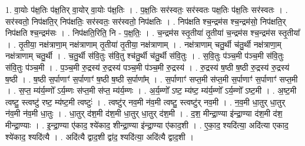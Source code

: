 \documentclass[17pt]{extarticle}
\begin{document}
1. वा॒योः प॑क्ष॒तिः प॑क्ष॒तिर् वा॒योर् वा॒योः प॑क्ष॒तिः । . प॒क्ष॒तिः सर॑स्वतः॒ सर॑स्वतः पक्ष॒तिः प॑क्ष॒तिः सर॑स्वतः । . सर॑स्वतो॒ निप॑क्षति॒र् निप॑क्षतिः॒ सर॑स्वतः॒ सर॑स्वतो॒ निप॑क्षतिः । . निप॑क्षति श्च॒न्द्रम॑स श्च॒न्द्रम॑सो॒ निप॑क्षति॒र् निप॑क्षति श्च॒न्द्रम॑सः । . निप॑क्षति॒रिति॒ नि - प॒क्ष॒तिः॒ । . च॒न्द्रम॑स स्तृ॒तीया॑ तृ॒तीया॑ च॒न्द्रम॑स श्च॒न्द्रम॑स स्तृ॒तीया᳚ । . तृ॒तीया॒ नक्ष॑त्राणा॒म् नक्ष॑त्राणाम् तृ॒तीया॑ तृ॒तीया॒ नक्ष॑त्राणाम् । . नक्ष॑त्राणाम् चतु॒र्थी च॑तु॒र्थी नक्ष॑त्राणा॒म् नक्ष॑त्राणाम् चतु॒र्थी । . च॒तु॒र्थी स॑वि॒तुः स॑वि॒तु श्च॑तु॒र्थी च॑तु॒र्थी स॑वि॒तुः । . स॒वि॒तुः प॑ञ्च॒मी प॑ञ्च॒मी स॑वि॒तुः स॑वि॒तुः प॑ञ्च॒मी । . प॒ञ्च॒मी रु॒द्रस्य॑ रु॒द्रस्य॑ पञ्च॒मी प॑ञ्च॒मी रु॒द्रस्य॑ । . रु॒द्रस्य॑ ष॒ष्ठी ष॒ष्ठी रु॒द्रस्य॑ रु॒द्रस्य॑ ष॒ष्ठी । . ष॒ष्ठी स॒र्पाणाꣳ॑ स॒र्पाणाꣳ॑ ष॒ष्ठी ष॒ष्ठी स॒र्पाणा᳚म् । . स॒र्पाणाꣳ॑ सप्त॒मी स॑प्त॒मी स॒र्पाणाꣳ॑ स॒र्पाणाꣳ॑ सप्त॒मी । . स॒प्त॒ म्य॑र्य॒म्णो᳚ ऽर्य॒म्णः स॑प्त॒मी स॑प्त॒ म्य॑र्य॒म्णः । . अ॒र्य॒म्णो᳚ ऽष्ट॒ म्य॑ष्ट॒ म्य॑र्य॒म्णो᳚ ऽर्य॒म्णो᳚ ऽष्ट॒मी । . अ॒ष्ट॒मी त्वष्टु॒ स्त्वष्टु॑ रष्ट॒ म्य॑ष्ट॒मी त्वष्टुः॑ । . त्वष्टु॑र् नव॒मी न॑व॒मी त्वष्टु॒ स्त्वष्टु॑र् नव॒मी । . न॒व॒मी धा॒तुर् धा॒तुर् न॑व॒मी न॑व॒मी धा॒तुः । . धा॒तुर् द॑श॒मी द॑श॒मी धा॒तुर् धा॒तुर् द॑श॒मी । . द॒श॒ मीन्द्रा॒ण्या इ॑न्द्रा॒ण्या द॑श॒मी द॑श॒ मीन्द्रा॒ण्याः । . इ॒न्द्रा॒ण्या ए॑काद॒ श्ये॑काद॒ शीन्द्रा॒ण्या इ॑न्द्रा॒ण्या ए॑काद॒शी । . ए॒का॒द॒ श्यदि॑त्या॒ अदि॑त्या एकाद॒ श्ये॑काद॒ श्यदि॑त्यै । . अदि॑त्यै द्वाद॒शी द्वा॑द॒ श्यदि॑त्या॒ अदि॑त्यै द्वाद॒शी । \newline
\end{document}
